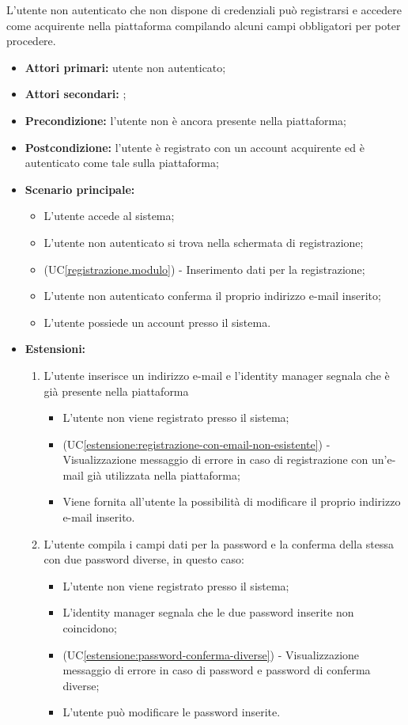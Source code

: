 L'utente non autenticato che non dispone di credenziali può registrarsi e accedere come acquirente nella piattaforma compilando alcuni campi obbligatori per poter procedere.
\begin{itemize}
	\item \textbf{Attori primari:} utente non autenticato;
	\item \textbf{Attori secondari:} ;
	\item \textbf{Precondizione:} l'utente non è ancora presente nella piattaforma;
	\item \textbf{Postcondizione:} l'utente è registrato con un account acquirente ed è autenticato come tale sulla piattaforma;
	\item \textbf{Scenario principale:}
	\begin{itemize}
		\item L'utente accede al sistema;
		\item L'utente non autenticato si trova nella schermata di registrazione;
		\item (UC\ref{registrazione.modulo}) - Inserimento dati per la registrazione;
		\item L'utente non autenticato conferma il proprio indirizzo e-mail inserito;
		\item L'utente possiede un account presso il sistema.
	\end{itemize}
	\item \textbf{Estensioni:}
	\begin{enumerate}[label=\lett]
		\item L'utente inserisce un indirizzo e-mail e l'identity manager segnala che è già presente nella piattaforma
		\begin{itemize}
			\item L'utente non viene registrato presso il sistema;
			\item (UC\ref{estensione:registrazione-con-email-non-esistente}) - Visualizzazione messaggio di errore in caso di registrazione con un'e-mail già utilizzata nella piattaforma;
			\item Viene fornita all'utente la possibilità di modificare il proprio indirizzo e-mail inserito.
		\end{itemize}
		\item L'utente compila i campi dati per la password e la conferma della stessa con due password diverse, in questo caso:
		\begin{itemize}
			\item L'utente non viene registrato presso il sistema;
			\item L'identity manager segnala che le due password inserite non coincidono;
			\item (UC\ref{estensione:password-conferma-diverse}) - Visualizzazione messaggio di errore in caso di password e password di conferma diverse;
			\item L'utente può modificare le password inserite.
		\end{itemize}
	\end{enumerate}
\end{itemize}

